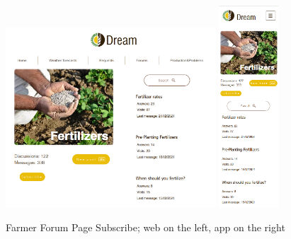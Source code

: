 \documentclass{article}
\begin{document}
        \newpage
        \begin{figure} [h]
            \centering
            \includegraphics[width=0.7\textwidth]{images/UserInterfaces/Farmer/Forum/ForumPageSubWeb.png}
            \quad
            \includegraphics[width=0.2\textwidth]{images/UserInterfaces/Farmer/Forum/ForumPageSubApp.png}
            \quad
            \caption{\label{fig:farmerForumPageSub}Farmer Forum Page Subscribe; web on the left, app on the right}
        \end{figure}
        \newpage
\end{document}
